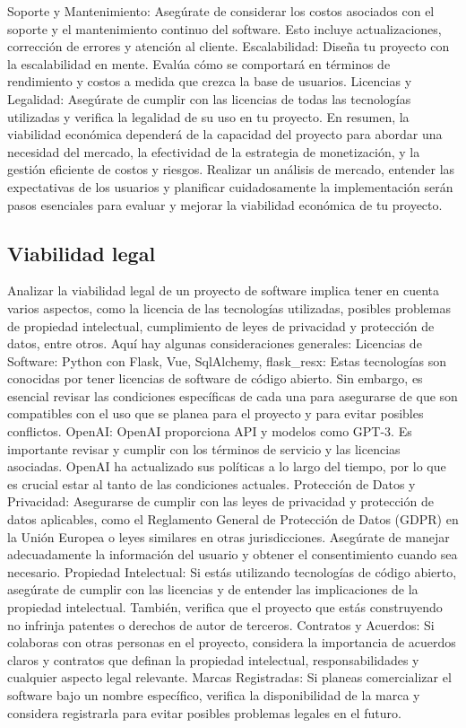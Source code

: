 Soporte y Mantenimiento:
Asegúrate de considerar los costos asociados con el soporte y 
el mantenimiento continuo del software. 
Esto incluye actualizaciones, corrección de errores y atención al cliente.
Escalabilidad:
Diseña tu proyecto con la escalabilidad en mente.
Evalúa cómo se comportará en términos de rendimiento y costos a medida que crezca la base de usuarios.
Licencias y Legalidad:
Asegúrate de cumplir con las licencias de todas las tecnologías utilizadas y 
verifica la legalidad de su uso en tu proyecto.
En resumen, la viabilidad económica dependerá de la capacidad del 
proyecto para abordar una necesidad del mercado, la efectividad de la estrategia de monetización, 
y la gestión eficiente de costos y riesgos. 
Realizar un análisis de mercado, entender las expectativas de los usuarios y 
planificar cuidadosamente la implementación serán pasos esenciales para evaluar y 
mejorar la viabilidad económica de tu proyecto.

\subsection{Viabilidad legal}

Analizar la viabilidad legal de un proyecto de software implica tener en cuenta varios aspectos, como la licencia de las tecnologías utilizadas, posibles problemas de propiedad intelectual, cumplimiento de leyes de privacidad y protección de datos, entre otros. Aquí hay algunas consideraciones generales:
Licencias de Software:
Python con Flask, Vue, SqlAlchemy, flask\_resx: Estas tecnologías son conocidas 
por tener licencias de software de código abierto. 
Sin embargo, es esencial revisar las condiciones específicas 
de cada una para asegurarse de que son compatibles con el uso que 
se planea para el proyecto y para evitar posibles conflictos.
OpenAI: OpenAI proporciona API y modelos como GPT-3. 
Es importante revisar y cumplir con los términos de servicio y las licencias asociadas. 
OpenAI ha actualizado sus políticas a lo largo del tiempo, 
por lo que es crucial estar al tanto de las condiciones actuales.
Protección de Datos y Privacidad:
Asegurarse de cumplir con las leyes de privacidad y protección de datos aplicables, 
como el Reglamento General de Protección de Datos (GDPR) 
en la Unión Europea o leyes similares en otras jurisdicciones. 
Asegúrate de manejar adecuadamente la información del usuario y obtener el consentimiento cuando sea necesario.
Propiedad Intelectual:
Si estás utilizando tecnologías de código abierto, asegúrate de cumplir con las licencias y 
de entender las implicaciones de la propiedad intelectual. 
También, verifica que el proyecto que estás construyendo no infrinja patentes o derechos de autor de terceros.
Contratos y Acuerdos:
Si colaboras con otras personas en el proyecto, considera la importancia de acuerdos claros y contratos que definan la propiedad intelectual, responsabilidades y cualquier aspecto legal relevante.
Marcas Registradas:
Si planeas comercializar el software bajo un nombre específico, 
verifica la disponibilidad de la marca y considera registrarla para evitar posibles problemas legales en el futuro.
